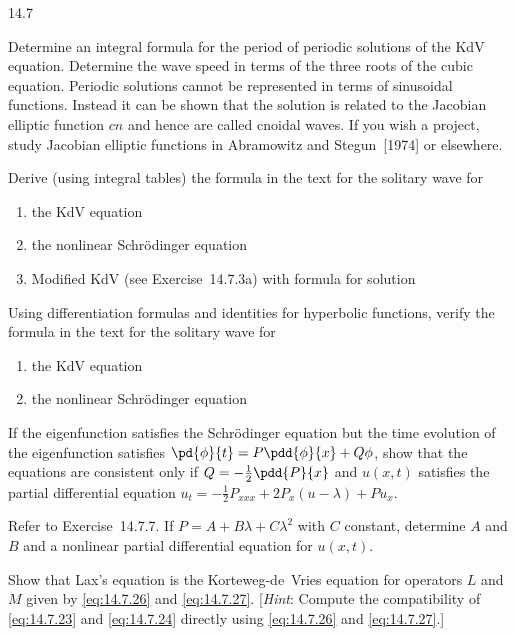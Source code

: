 \begin{exercises}{14.7}
\item Determine an integral formula for the period of periodic solutions of the KdV equation.  Determine the wave speed in terms of the three roots of the cubic equation.  Periodic solutions cannot be represented in terms of sinusoidal functions.  Instead it can be shown that the solution is related to the Jacobian elliptic function $cn$ and hence are called cnoidal waves.  If you wish a project, study Jacobian elliptic functions in Abramowitz and Stegun~[1974] or elsewhere.

\item Derive (using integral tables) the formula in the text for the solitary wave for
\begin{enumerate}
\item[(a)] the KdV equation
\item[(b)] the nonlinear Schr\"odinger equation
\item[(c)] Modified KdV (see Exercise~14.7.3a) with formula for solution
\end{enumerate}

\item Using differentiation formulas and identities for hyperbolic functions, verify the formula in the text for the solitary wave for
\begin{enumerate}
\item[(a)] the KdV equation
\item[(b)] the nonlinear Schr\"odinger equation
\end{enumerate}

\item If the eigenfunction satisfies the Schr\"odinger equation but the time evolution of the eigenfunction satisfies $\pd{\phi}{t} = P\pdd{\phi}{x} + Q\phi$, show that the equations are consistent only if $Q = -\frac{1}{2}\pdd{P}{x}$ and $u(x,t)$ satisfies the partial differential equation $u_t = -\frac{1}{2}P_{xxx} + 2P_x(u - \lambda) + Pu_x$.

\item[\starred] Refer to Exercise~14.7.7.  If $P = A + B\lambda + C\lambda^2$ with $C$ constant, determine $A$ and $B$ and a nonlinear partial differential equation for $u(x,t)$.

\item Show that Lax's equation is the Korteweg-de~Vries equation for operators $L$ and $M$ given by \eqref{eq:14.7.26} and \eqref{eq:14.7.27}.  [\textit{Hint}: Compute the compatibility of \eqref{eq:14.7.23} and \eqref{eq:14.7.24} directly using \eqref{eq:14.7.26} and \eqref{eq:14.7.27}.]


\end{exercises}
